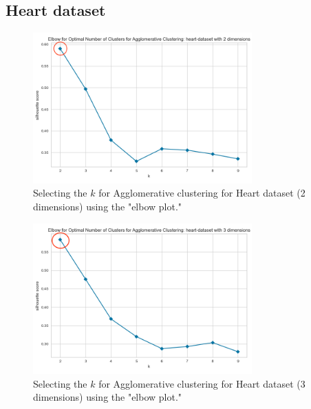 \newpage

\subsection{Heart dataset}
\begin{figure}[H]
  \includegraphics[width=0.75\textwidth]{Appendix//parameter-selection/heart-dataset-2-agglomerative.png}
  \caption{Selecting the $k$ for Agglomerative clustering for Heart dataset (2 dimensions) using the "elbow plot."}
  \label{hyperparameters:agglomerative-heart-dataset-2d}
\end{figure}
\begin{figure}[H]
  \includegraphics[width=0.75\textwidth]{Appendix//parameter-selection/heart-dataset-3-agglomerative.png}
  \caption{Selecting the $k$ for Agglomerative clustering for Heart dataset (3 dimensions) using the "elbow plot."}
  \label{hyperparameters:agglomerative-heart-dataset-3d}
\end{figure}
